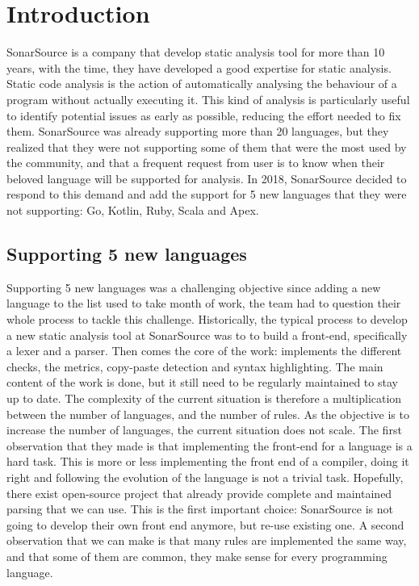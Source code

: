 \section{Introduction}
\label{sec:introduction}
SonarSource is a company that develop static analysis tool for more than 10 years, with the time, they have developed a good expertise for static analysis.
Static code analysis is the action of automatically analysing the behaviour of a program without actually executing it.
This kind of analysis is particularly useful to identify potential issues as early as possible, reducing the effort needed to fix them.
SonarSource was already supporting more than 20 languages, but they realized that they were not supporting some of them that were the most used by the community, and that a frequent request from user is to know when their beloved language will be supported for analysis. 
In 2018, SonarSource decided to respond to this demand and add the support for 5 new languages that they were not supporting: Go, Kotlin, Ruby, Scala and Apex.

\subsection{Supporting 5 new languages}
\label{subsec:5_new_languages}
Supporting 5 new languages was a challenging objective since adding a new language to the list used to take month of work, the team had to question their whole process to tackle this challenge.
Historically, the typical process to develop a new static analysis tool at SonarSource was to to build a front-end, specifically a lexer and a parser.
Then comes the core of the work: implements the different checks, the metrics, copy-paste detection and syntax highlighting. The main content of the work is done, but it still need to be regularly maintained to stay up to date.
The complexity of the current situation is therefore a multiplication between the number of languages, and the number of rules. 
As the objective is to increase the number of languages, the current situation does not scale.
The first observation that they made is that implementing the front-end for a language is a hard task. This is more or less implementing the front end of a compiler, doing it right and following the evolution of the language is not a trivial task.
Hopefully, there exist open-source project that already provide complete and maintained parsing that we can use. 
This is the first important choice: SonarSource is not going to develop their own front end anymore, but re-use existing one.
A second observation that we can make is that many rules are implemented the same way, and that some of them are common, they make sense for every programming language.


